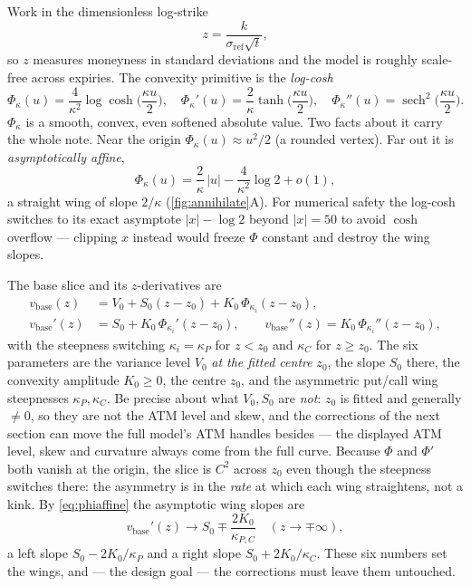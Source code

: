\documentclass[11pt]{article}
\newcommand{\vref}{\sigma_{\mathrm{ref}}}
\newcommand{\Phik}{\Phi_\kappa}
\begin{document}
Work in the dimensionless log-strike
\begin{equation}
z=\frac{k}{\vref\sqrt t},
\label{eq:zdef}
\end{equation}
so $z$ measures moneyness in standard deviations and the model is roughly
scale-free across expiries.  The convexity primitive is the \emph{log-cosh}
\begin{equation}
\Phik(u)=\frac{4}{\kappa^2}\log\cosh\!\Big(\frac{\kappa u}{2}\Big),\quad
\Phik'(u)=\frac{2}{\kappa}\tanh\!\Big(\frac{\kappa u}{2}\Big),\quad
\Phik''(u)=\operatorname{sech}^2\!\Big(\frac{\kappa u}{2}\Big).
\label{eq:phi}
\end{equation}
$\Phik$ is a smooth, convex, even softened absolute value.  Two facts about it
carry the whole note.  Near the origin $\Phik(u)\approx u^2/2$ (a rounded
vertex).  Far out it is \emph{asymptotically affine},
\begin{equation}
\Phik(u)=\frac{2}{\kappa}\,|u|-\frac{4}{\kappa^2}\log 2+o(1),
\label{eq:phiaffine}
\end{equation}
a straight wing of slope $2/\kappa$ (\cref{fig:annihilate}A).  For numerical
safety the log-cosh switches to its exact asymptote $|x|-\log2$ beyond $|x|=50$
to avoid $\cosh$ overflow --- clipping $x$ instead would freeze $\Phi$ constant
and destroy the wing slopes.

The base slice and its $z$-derivatives are
\begin{equation}
\begin{aligned}
v_{\mathrm{base}}(z)&=V_0+S_0(z-z_0)+K_0\,\Phi_{\kappa_i}(z-z_0),\\
v_{\mathrm{base}}'(z)&=S_0+K_0\,\Phi_{\kappa_i}'(z-z_0),\qquad
v_{\mathrm{base}}''(z)=K_0\,\Phi_{\kappa_i}''(z-z_0),
\end{aligned}
\label{eq:base}
\end{equation}
with the steepness switching $\kappa_i=\kappa_P$ for $z<z_0$ and $\kappa_C$ for
$z\ge z_0$.  The six parameters are the variance level $V_0$ \emph{at the fitted
centre} $z_0$, the slope $S_0$ there, the convexity amplitude $K_0\ge0$, the
centre $z_0$, and the asymmetric put/call wing steepnesses $\kappa_P,\kappa_C$.
Be precise about what $V_0,S_0$ are \emph{not}: $z_0$ is fitted and generally
$\ne0$, so they are not the ATM level and skew, and the corrections of the next
section can move the full model's ATM handles besides --- the displayed ATM
level, skew and curvature always come from the full curve.  Because $\Phi$ and
$\Phi'$ both vanish at the origin, the slice is $C^2$ across $z_0$ even though
the steepness switches there: the asymmetry is in the \emph{rate} at which each
wing straightens, not a kink.  By \eqref{eq:phiaffine} the asymptotic wing
slopes are
\begin{equation}
v_{\mathrm{base}}'(z)\to S_0\mp\frac{2K_0}{\kappa_{P,C}}\quad(z\to\mp\infty),
\label{eq:wingslopes}
\end{equation}
a left slope $S_0-2K_0/\kappa_P$ and a right slope $S_0+2K_0/\kappa_C$.  These
six numbers set the wings, and --- the design goal --- the corrections must
leave them untouched.
\end{document}
